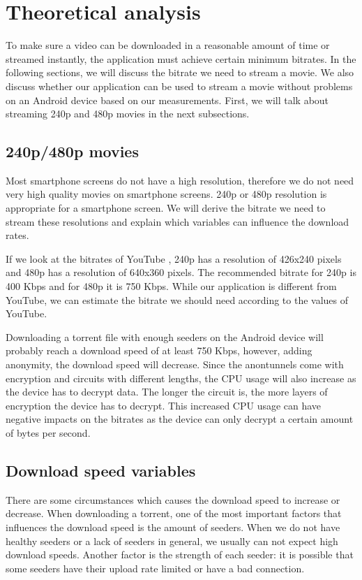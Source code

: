 \section{Theoretical analysis}
	To make sure a video can be downloaded in a reasonable amount of time or streamed instantly, the application must achieve certain minimum bitrates. In the following sections, we will discuss the bitrate we need to stream a movie. We also discuss whether our application can be used to stream a movie without problems on an Android device based on our measurements. First, we will talk about streaming 240p and 480p movies in the next subsections.
	
	\subsection{240p/480p movies}
		Most smartphone screens do not have a high resolution, therefore we do not need very high quality movies on smartphone screens. 240p or 480p resolution is appropriate for a smartphone screen. We will derive the bitrate we need to stream these resolutions and explain which variables can influence the download rates.
		
		If we look at the bitrates of YouTube \cite{googlebitrates}, 240p has a resolution of 426x240 pixels and 480p has a resolution of 640x360 pixels. The recommended bitrate for 240p is 400 Kbps and for 480p it is 750 Kbps. While our application is different from YouTube, we can estimate the bitrate we should need according to the values of YouTube.
		
		Downloading a torrent file with enough seeders on the Android device will probably reach a download speed of at least 750 Kbps, however, adding anonymity, the download speed will decrease. Since the anontunnels come with encryption and circuits with different lengths, the CPU usage will also increase as the device has to decrypt data. The longer the circuit is, the more layers of encryption the device has to decrypt. This increased CPU usage can have negative impacts on the bitrates as the device can only decrypt a certain amount of bytes per second.
		
	\subsection{Download speed variables}
		There are some circumstances which causes the download speed to increase or decrease. When downloading a torrent, one of the most important factors that influences the download speed is the amount of seeders. When we do not have healthy seeders or a lack of seeders in general, we usually can not expect high download speeds. Another factor is the strength of each seeder: it is possible that some seeders have their upload rate limited or have a bad connection.
		
